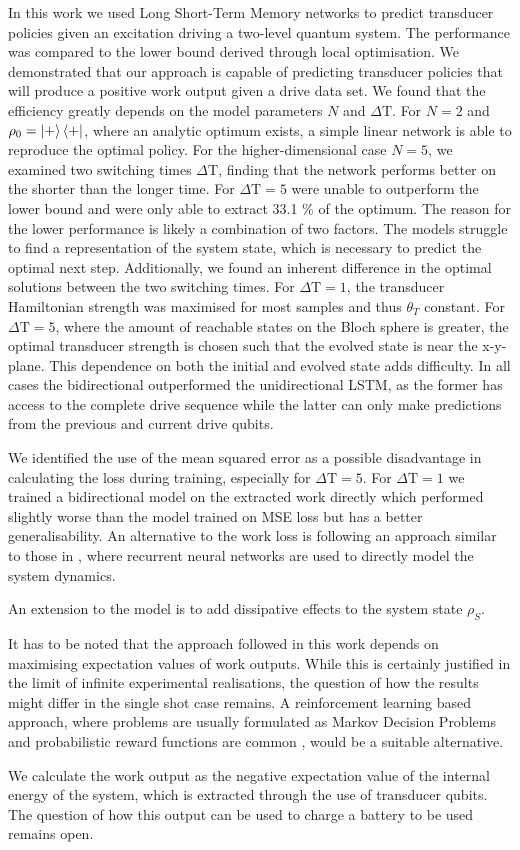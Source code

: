 In this work we used Long Short-Term Memory networks to predict transducer policies given an excitation driving a two-level quantum system.
The performance was compared to the lower bound derived through local optimisation.
We demonstrated that our approach is capable of predicting transducer policies that will produce a positive work output given a drive data set.
We found that the efficiency greatly depends on the model parameters $N$ and $\Delta \mathrm{T}$.
For $N=2$ and $\rho_0 = \ket{+}\bra{+}$, where an analytic optimum exists, a simple linear network is able to reproduce the optimal policy.
For the higher-dimensional case $N=5$, we examined two switching times $\Delta \mathrm{T}$, finding that the network performs better on the shorter than the longer time.
For $\Delta \mathrm{T} = 5$ were unable to outperform the lower bound and were only able to extract 33.1 \% of the optimum.
The reason for the lower performance is likely a combination of two factors.
The models struggle to find a representation of the system state, which is necessary to predict the optimal next step.
Additionally, we found an inherent difference in the optimal solutions between the two switching times. For $\Delta \mathrm{T} = 1$, the transducer Hamiltonian strength was maximised for most samples and thus $\theta_T$ constant.
For $\Delta \mathrm{T} = 5$, where the amount of reachable states on the Bloch sphere is greater, the optimal transducer strength is chosen such that the evolved state is near the x-y-plane.
This dependence on both the initial and evolved state adds difficulty.
In all cases the bidirectional outperformed the unidirectional LSTM, as the former has access to the complete drive sequence while the latter can only make predictions from the previous and current drive qubits.

We identified the use of the mean squared error as a possible disadvantage in calculating the loss during training, especially for $\Delta \mathrm{T} = 5$.
For $\Delta \mathrm{T} = 1$ we trained a bidirectional model on the extracted work directly which performed slightly worse than the model trained on MSE loss but has a better generalisability.
An alternative to the work loss is following an approach similar to those in \cite{Banchi_2018, PhysRevX.10.011006}, where recurrent neural networks are used to directly model the system dynamics.

An extension to the model is to add dissipative effects to the system state $\rho_S$.


It has to be noted that the approach followed in this work depends on maximising expectation values of work outputs.
While this is certainly justified in the limit of infinite experimental realisations, the question of how the results might differ in the single shot case remains.
A reinforcement learning based approach, where problems are usually formulated as Markov Decision Problems and probabilistic reward functions are common \cite{Sutton1998}, would be a suitable alternative.

We calculate the work output as the negative expectation value of the internal energy of the system, which is extracted through the use of transducer qubits.
The question of how this output can be used to charge a battery to be used remains open.
